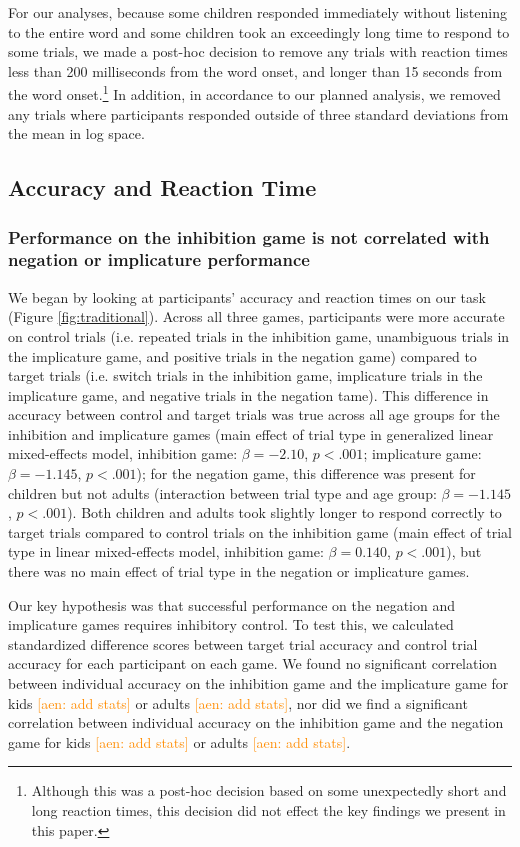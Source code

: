 \documentclass[10pt,letterpaper]{article}
\newcommand{\aen}[1]{\textcolor{DarkOrange}{[aen: #1]}}
\begin{document}
For our analyses, because some children responded immediately without listening to the entire word and some children took an exceedingly long time to respond to some trials, we made a post-hoc decision to remove any trials with reaction times less than 200 milliseconds from the word onset, and longer than 15 seconds from the word onset.\footnote{Although this was a post-hoc decision based on some unexpectedly short and long reaction times, this decision did not effect the key findings we present in this paper.}  In addition, in accordance to our planned analysis, we removed any trials where participants responded outside of three standard deviations from the mean in log space.

\subsection{Accuracy and Reaction Time}

\subsubsection{Performance on the inhibition game is not correlated with negation or implicature performance}

We began by looking at participants' accuracy and reaction times on our task (Figure \ref{fig:traditional}).  Across all three games, participants were more accurate on control trials (i.e. repeated trials in the inhibition game, unambiguous trials in the implicature game, and positive trials in the negation game) compared to target trials (i.e. switch trials in the inhibition game, implicature trials in the implicature game, and negative trials in the negation tame).  This difference in accuracy between control and target trials was true across all age groups for the inhibition and implicature games (main effect of trial type in generalized linear mixed-effects model, inhibition game: $\beta = -2.10$, $p< .001$; implicature game: $\beta = -1.145$, $p< .001$); for the negation game, this difference was present for children but not adults (interaction between trial type and age group: $\beta = -1.145$, $p< .001$).  Both children and adults took slightly longer to respond correctly to target trials compared to control trials on the inhibition game (main effect of trial type in linear mixed-effects model, inhibition game: $\beta = 0.140$, $p< .001$), but there was no main effect of trial type in the negation or implicature games.  

Our key hypothesis was that successful performance on the negation and implicature games requires inhibitory control.  To test this, we calculated standardized difference scores between target trial accuracy and control trial accuracy for each participant on each game.  We found no significant correlation between individual accuracy on the inhibition game and the implicature game for kids \aen{add stats} or adults \aen{add stats}, nor did we find a significant correlation between individual accuracy on the inhibition game and the negation game for kids \aen{add stats} or adults \aen{add stats}.  
\end{document}
